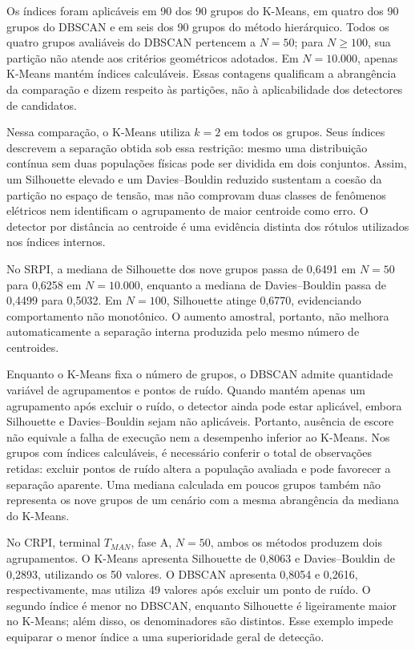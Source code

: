 \documentclass[
	12pt,				%
	openright,			%
	oneside,			%
	a4paper,			%
	chapter=TITLE,		%
	section=TITLE,		%
	subsection=TITLE,	%
	subsubsection=TITLE,%
	english,			%
	brazilian			%
	]{abntex2}
\theoremstyle{definition}
\begin{document}
\clearpage


Os índices foram aplicáveis em 90 dos 90 grupos do K-Means, em quatro
dos 90 grupos do DBSCAN e em seis dos 90 grupos do método hierárquico.
Todos os quatro grupos avaliáveis do DBSCAN pertencem a $N=50$;
para $N\geq100$, sua partição não atende aos critérios geométricos
adotados. Em $N=10.000$, apenas K-Means mantém índices calculáveis.
Essas contagens qualificam a abrangência da comparação e dizem respeito
às partições, não à aplicabilidade dos detectores de candidatos.

Nessa comparação, o K-Means utiliza $k=2$ em todos os grupos. Seus índices
descrevem a
separação obtida sob essa restrição: mesmo uma distribuição contínua sem
duas populações físicas pode ser dividida em dois conjuntos. Assim,
um Silhouette elevado e um Davies--Bouldin reduzido sustentam a coesão
da partição no espaço de tensão, mas não comprovam duas classes de
fenômenos elétricos nem identificam o agrupamento de maior centroide como erro.
O detector por distância ao centroide é uma evidência distinta dos rótulos
utilizados nos índices internos.

No SRPI, a mediana de Silhouette dos nove grupos passa de 0,6491 em
$N=50$ para 0,6258 em $N=10.000$, enquanto a mediana de
Davies--Bouldin passa de 0,4499 para 0,5032. Em $N=100$, Silhouette
atinge 0,6770, evidenciando comportamento não monotônico. O aumento
amostral, portanto, não melhora automaticamente a separação interna
produzida pelo mesmo número de centroides.

Enquanto o K-Means fixa o número de grupos, o DBSCAN admite quantidade
variável de agrupamentos e pontos de ruído.
Quando mantém apenas um agrupamento após excluir o ruído, o detector ainda
pode estar aplicável, embora Silhouette e Davies--Bouldin sejam não
aplicáveis. Portanto, ausência de escore não equivale a falha de execução
nem a desempenho inferior ao K-Means. Nos grupos com índices calculáveis,
é necessário conferir o total de observações retidas: excluir pontos de
ruído altera a população avaliada e pode favorecer a separação aparente.
Uma mediana calculada em poucos grupos também não representa os nove
grupos de um cenário com a mesma abrangência da mediana do K-Means.

No CRPI, terminal $T_{MAN}$, fase A, $N=50$, ambos os métodos produzem
dois agrupamentos. O K-Means apresenta Silhouette de 0,8063 e
Davies--Bouldin de 0,2893, utilizando os 50 valores. O DBSCAN apresenta
0,8054 e 0,2616, respectivamente, mas utiliza 49 valores após excluir
um ponto de ruído. O segundo índice é menor no DBSCAN, enquanto
Silhouette é ligeiramente maior no K-Means; além disso, os denominadores
são distintos. Esse exemplo impede equiparar o menor índice a uma
superioridade geral de detecção.
\end{document}

